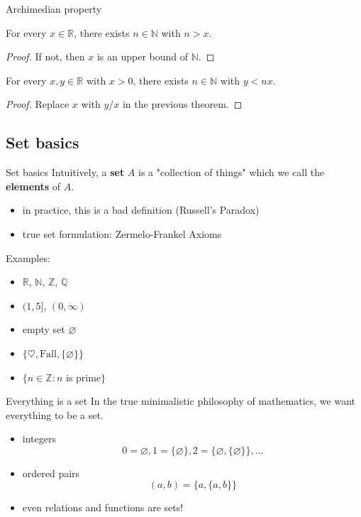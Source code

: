 \documentclass{beamer}
\begin{document}
\begin{frame}{Archimedian property}
\begin{thm}
For every $x\in\mathbb{R}$, there exists $n\in\mathbb N$ with $n>x$.
\end{thm}
\pause
\begin{proof}
If not, then $x$ is an upper bound of $\mathbb N$.
\end{proof}
\pause
\begin{thm}
For every $x,y\in\mathbb{R}$ with $x>0$, there exists $n\in\mathbb N$ with $y<nx$.
\end{thm}
\pause
\begin{proof}
Replace $x$ with $y/x$ in the previous theorem.
\end{proof}
\end{frame}


\subsection{Set basics}

\begin{frame}{Set basics}
Intuitively, a \textbf{set} $A$ is a "collection of things" which we call the \textbf{elements} of $A$.
\begin{itemize}
\pause
\item in practice, this is a bad definition (Russell's Paradox)
\pause
\item true set formulation: Zermelo-Frankel Axioms
\end{itemize}
\pause
Examples:
\begin{itemize}
\pause
\item $\mathbb R$, $\mathbb N$, $\mathbb{Z}$, $\mathbb{Q}$
\pause
\item $(1,5]$, $(0,\infty)$
\pause
\item empty set $\varnothing$
\pause
\item $\{\heartsuit,\text{Fall}, \{\varnothing\}\}$
\pause
\item $\{n\in \mathbb{Z}: \text{$n$ is prime}\}$
\end{itemize}
\end{frame}

\begin{frame}{Everything is a set}
In the true minimalistic philosophy of mathematics, we want everything to be a set.
\begin{itemize}
\pause
\item integers
\pause
$$0 = \varnothing, 1 = \{\varnothing\}, 2 = \{\varnothing,\{\varnothing\}\},\dots$$
\pause
\item ordered pairs
\pause
$$(a,b) = \{a,\{a,b\}\}$$
\pause
\item even relations and functions are sets!
\end{itemize}
\end{frame}
\end{document}
